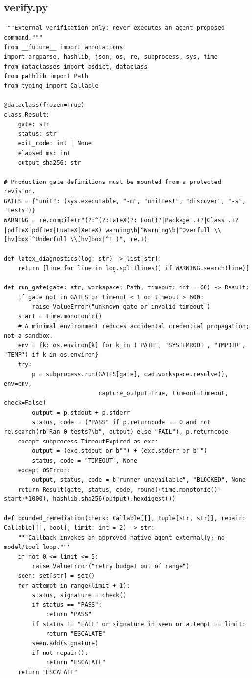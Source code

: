 \documentclass[11pt,letterpaper]{article}
\begin{document}
\subsection*{verify.py}
\begin{lstlisting}
"""External verification only: never executes an agent-proposed command."""
from __future__ import annotations
import argparse, hashlib, json, os, re, subprocess, sys, time
from dataclasses import asdict, dataclass
from pathlib import Path
from typing import Callable

@dataclass(frozen=True)
class Result:
    gate: str
    status: str
    exit_code: int | None
    elapsed_ms: int
    output_sha256: str

# Production gate definitions must be mounted from a protected revision.
GATES = {"unit": (sys.executable, "-m", "unittest", "discover", "-s", "tests")}
WARNING = re.compile(r"(?:^(?:LaTeX(?: Font)?|Package .+?|Class .+?|pdfTeX|pdftex|LuaTeX|XeTeX) warning\b|^Warning\b|^Overfull \\[hv]box|^Underfull \\[hv]box|^! )", re.I)

def latex_diagnostics(log: str) -> list[str]:
    return [line for line in log.splitlines() if WARNING.search(line)]

def run_gate(gate: str, workspace: Path, timeout: int = 60) -> Result:
    if gate not in GATES or timeout < 1 or timeout > 600:
        raise ValueError("unknown gate or invalid timeout")
    start = time.monotonic()
    # A minimal environment reduces accidental credential propagation; not a sandbox.
    env = {k: os.environ[k] for k in ("PATH", "SYSTEMROOT", "TMPDIR", "TEMP") if k in os.environ}
    try:
        p = subprocess.run(GATES[gate], cwd=workspace.resolve(), env=env,
                           capture_output=True, timeout=timeout, check=False)
        output = p.stdout + p.stderr
        status, code = ("PASS" if p.returncode == 0 and not re.search(rb"Ran 0 tests?\b", output) else "FAIL"), p.returncode
    except subprocess.TimeoutExpired as exc:
        output = (exc.stdout or b"") + (exc.stderr or b"")
        status, code = "TIMEOUT", None
    except OSError:
        output, status, code = b"runner unavailable", "BLOCKED", None
    return Result(gate, status, code, round((time.monotonic()-start)*1000), hashlib.sha256(output).hexdigest())

def bounded_remediation(check: Callable[[], tuple[str, str]], repair: Callable[[], bool], limit: int = 2) -> str:
    """Callback invokes an approved native agent externally; no model/tool loop."""
    if not 0 <= limit <= 5:
        raise ValueError("retry budget out of range")
    seen: set[str] = set()
    for attempt in range(limit + 1):
        status, signature = check()
        if status == "PASS":
            return "PASS"
        if status != "FAIL" or signature in seen or attempt == limit:
            return "ESCALATE"
        seen.add(signature)
        if not repair():
            return "ESCALATE"
    return "ESCALATE"


\end{lstlisting}
\end{document}
